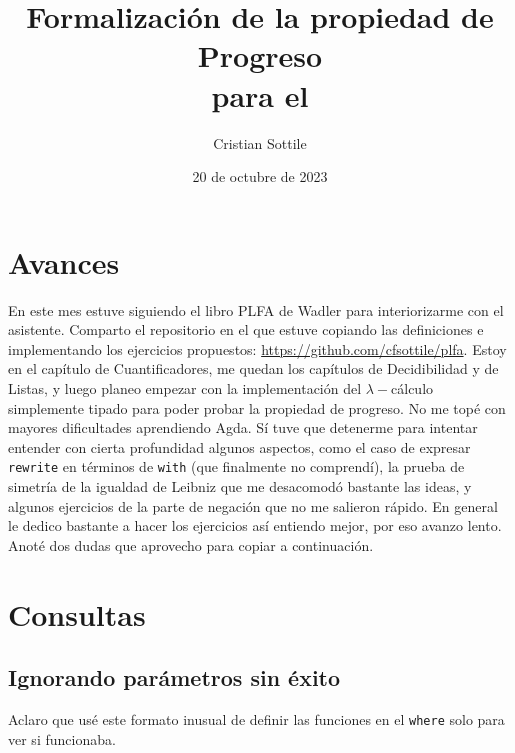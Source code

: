 \documentclass{article}
\title{Formalización de la propiedad de Progreso\\para el \stlcw}
\author{Cristian Sottile}
\date{20 de octubre de 2023}
\newcommand{\stlcw}{$\lambda-$cálculo simplemente tipado\xspace}
\begin{document}
\maketitle


\section{Avances}

En este mes estuve siguiendo el libro PLFA de Wadler para interiorizarme con el
asistente. Comparto el repositorio en el que estuve copiando las definiciones e
implementando los ejercicios propuestos:
\url{https://github.com/cfsottile/plfa}. Estoy en el capítulo de
Cuantificadores, me quedan los capítulos de Decidibilidad y de Listas, y luego
planeo empezar con la implementación del $\lambda-$cálculo simplemente tipado
para poder probar la propiedad de progreso. No me topé con mayores dificultades
aprendiendo Agda. Sí tuve que detenerme para intentar entender con cierta
profundidad algunos aspectos, como el caso de expresar \texttt{rewrite} en
términos de \texttt{with} (que finalmente no comprendí), la prueba de simetría
de la igualdad de Leibniz que me desacomodó bastante las ideas, y algunos
ejercicios de la parte de negación que no me salieron rápido. En general le
dedico bastante a hacer los ejercicios así entiendo mejor, por eso avanzo lento.
Anoté dos dudas que aprovecho para copiar a continuación.

\newpage

\section{Consultas}

\subsection{Ignorando parámetros sin éxito}

Aclaro que usé este formato inusual de definir las funciones en el
\texttt{where} solo para ver si funcionaba.
\end{document}
